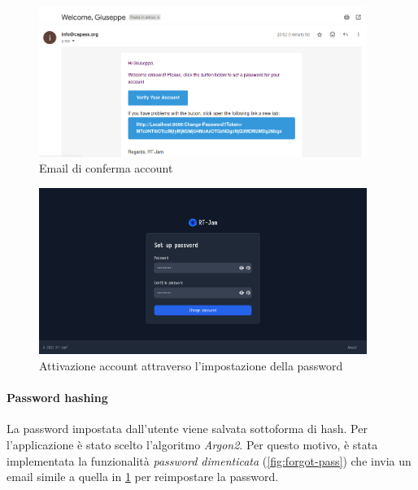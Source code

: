 \documentclass{article}
\begin{document}
\begin{figure}
  \begin{center}
    \includegraphics[width=0.95\textwidth]{figures/register_email.png}
  \end{center}
  \caption{Email di conferma account}\label{fig:register-email}
\end{figure}

\begin{figure}
  \begin{center}
    \includegraphics[width=0.95\textwidth]{figures/setpass_page.png}
  \end{center}
  \caption{Attivazione account attraverso l'impostazione della password}\label{fig:setpassword}
\end{figure}

\paragraph{Password hashing} La password impostata dall'utente viene salvata sottoforma di 
hash. Per l'applicazione è stato scelto l'algoritmo \textit{Argon2}. Per questo motivo, è
stata implementata la funzionalità \textit{password dimenticata} (\cref{fig:forgot-pass})
che invia un email simile a quella in \cref{fig:register-email} per reimpostare 
la password.
\end{document}
